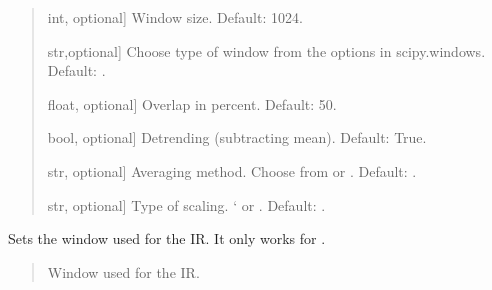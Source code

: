 \documentclass[letterpaper,10pt,english]{sphinxmanual}
\begin{document}
\begin{fulllineitems}
\begin{fulllineitems}
\begin{quote}
\begin{description}
\begin{description}
\sphinxlineitem{\sphinxstylestrong{window\_length\_samples}}{[}int, optional{]}
\sphinxAtStartPar
Window size. Default: 1024.

\sphinxlineitem{\sphinxstylestrong{window\_type}}{[}str,optional{]}
\sphinxAtStartPar
Choose type of window from the options in scipy.windows.
Default: .

\sphinxlineitem{\sphinxstylestrong{overlap\_percent}}{[}float, optional{]}
\sphinxAtStartPar
Overlap in percent. Default: 50.

\sphinxlineitem{\sphinxstylestrong{detrend}}{[}bool, optional{]}
\sphinxAtStartPar
Detrending (subtracting mean). Default: True.

\sphinxlineitem{\sphinxstylestrong{average}}{[}str, optional{]}
\sphinxAtStartPar
Averaging method. Choose from  or .
Default: .

\sphinxlineitem{\sphinxstylestrong{scaling}}{[}str, optional{]}
\sphinxAtStartPar
Type of scaling. ‘ or . Default: .

\end{description}

\end{description}\end{quote}

\end{fulllineitems}


\begin{fulllineitems}
\label{\detokenize{classes:dsptools.classes.signal_class.Signal.set_window}}
\pysigstartsignatures
{}
\pysigstopsignatures
\sphinxAtStartPar
Sets the window used for the IR. It only works for
.
\begin{quote}\begin{description}
\begin{description}
\sphinxlineitem{\sphinxstylestrong{window}}{[}\sphinxtitleref{np.ndarray}{]}
\sphinxAtStartPar
Window used for the IR.

\end{description}


\end{description}
\end{quote}
\end{fulllineitems}
\end{fulllineitems}
\end{document}
